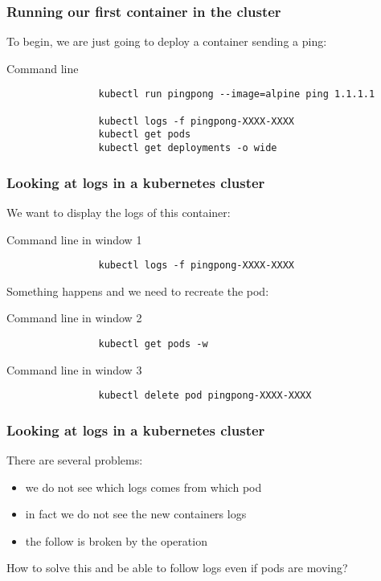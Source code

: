 	\begin{frame}[fragile]
		\frametitle{Running our first container in the cluster}
	
		To begin, we are just going to deploy a container sending a ping:
		\begin{block}{Command line}
			\begin{verbatim}
				kubectl run pingpong --image=alpine ping 1.1.1.1
				
				kubectl logs -f pingpong-XXXX-XXXX
				kubectl get pods
				kubectl get deployments -o wide
			\end{verbatim}
		\end{block}
	\end{frame}
	
	\begin{frame}[fragile]
		\frametitle{Looking at logs in a kubernetes cluster}
	
		We want to display the logs of this container:
		\begin{block}{Command line in window 1}
			\begin{verbatim}
				kubectl logs -f pingpong-XXXX-XXXX
			\end{verbatim}
		\end{block}
		
		Something happens and we need to recreate the pod:
		\begin{block}{Command line in window 2}
			\begin{verbatim}
				kubectl get pods -w
			\end{verbatim}
		\end{block}
		\begin{block}{Command line in window 3}
			\begin{verbatim}
				kubectl delete pod pingpong-XXXX-XXXX
			\end{verbatim}
		\end{block}
	\end{frame}
	
	\begin{frame}[fragile]
		\frametitle{Looking at logs in a kubernetes cluster}
	
		There are several problems:
		\begin{itemize}
			\item we do not see which logs comes from which pod
			\item in fact we do not see the new containers logs
			\item the follow is broken by the operation
		\end{itemize}
		
		How to solve this and be able to follow logs even if pods are moving?
	\end{frame}


